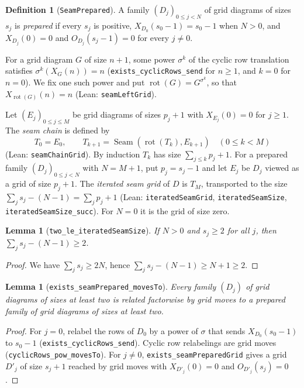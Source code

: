 \documentclass[11pt]{amsart}
\newtheorem{lemma}[theorem]{Lemma}
\theoremstyle{definition}
\newtheorem{definition}[theorem]{Definition}
\theoremstyle{remark}
\newcommand{\lean}[1]{\textnormal{\nolinkurl{#1}}}
\newcommand{\rot}{\operatorname{rot}}
\DeclareMathOperator{\seam}{Seam}
\begin{document}
\begin{definition}[\lean{SeamPrepared}]\label{def:prepared}
A family $(D_j)_{0\le j<N}$ of grid diagrams of sizes $s_j$ is \emph{prepared} if every $s_j$ is
positive, $X_{D_0}(s_0-1)=s_0-1$ when $N>0$, and $X_{D_j}(0)=0$ and $O_{D_j}(s_j-1)=0$ for every
$j\ne0$.
\end{definition}

For a grid diagram $G$ of size $n+1$, some power $\sigma^k$ of the cyclic row translation satisfies
$\sigma^k(X_G(n))=n$ (\lean{exists_cyclicRows_send} for $n\ge1$, and $k=0$ for $n=0$). We fix one
such power and put $\rot(G)=G^{\sigma^k}$, so that $X_{\rot(G)}(n)=n$ (Lean: \lean{seamLeftGrid}).

Let $(E_j)_{0\le j\le M}$ be grid diagrams of sizes $p_j+1$ with $X_{E_j}(0)=0$ for $j\ge1$. The
\emph{seam chain} is defined by
\[
T_0=E_0,\qquad T_{k+1}=\seam(\rot(T_k),E_{k+1})\quad(0\le k<M)
\]
(Lean: \lean{seamChainGrid}). By induction $T_k$ has size $\sum_{j\le k}p_j+1$. For a prepared family
$(D_j)_{0\le j<N}$ with $N=M+1$, put $p_j=s_j-1$ and let $E_j$ be $D_j$ viewed as a grid of size
$p_j+1$. The \emph{iterated seam grid} of $D$ is $T_M$, transported to the size
$\sum_js_j-(N-1)=\sum_jp_j+1$ (Lean: \lean{iteratedSeamGrid}, \lean{iteratedSeamSize},
\lean{iteratedSeamSize_succ}). For $N=0$ it is the grid of size zero.

\begin{lemma}[\lean{two_le_iteratedSeamSize}]\label{lem:size}
If $N>0$ and $s_j\ge2$ for all $j$, then $\sum_js_j-(N-1)\ge2$.
\end{lemma}

\begin{proof}
We have $\sum_js_j\ge2N$, hence $\sum_js_j-(N-1)\ge N+1\ge2$.
\end{proof}

\begin{lemma}[\lean{exists_seamPrepared_movesTo}]\label{lem:prepare}
Every family $(D_j)$ of grid diagrams of sizes at least two is related factorwise by grid moves to
a prepared family of grid diagrams of sizes at least two.
\end{lemma}

\begin{proof}
For $j=0$, relabel the rows of $D_0$ by a power of $\sigma$ that sends $X_{D_0}(s_0-1)$ to $s_0-1$
(\lean{exists_cyclicRows_send}). Cyclic row relabelings are grid moves
(\lean{cyclicRows_pow_movesTo}). For $j\ne0$, \lean{exists_seamPreparedGrid} gives a grid $D'_j$ of
size $s_j+1$ reached by grid moves with $X_{D'_j}(0)=0$ and $O_{D'_j}(s_j)=0$.
\end{proof}
\end{document}
